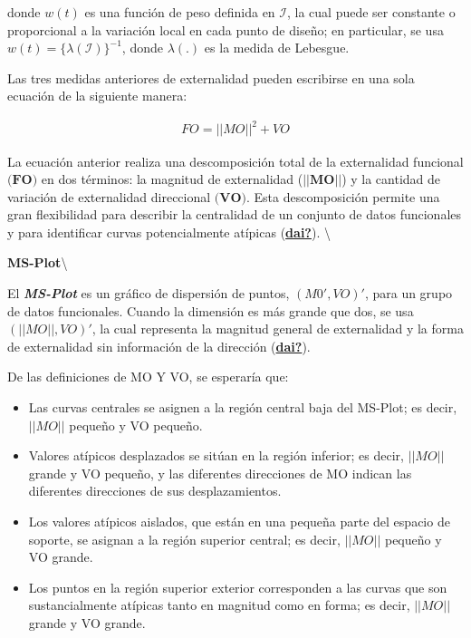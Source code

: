 \documentclass[
]{book}
\begin{document}
donde \(w(t)\) es una función de peso definida en \(\mathcal{I}\), la cual puede ser constante o proporcional a la variación local en cada punto de diseño; en particular, se usa \(w(t)=\{\lambda(\mathcal{I})\}^{-1}\), donde \(\lambda(.)\) es la medida de Lebesgue.

Las tres medidas anteriores de externalidad pueden escribirse en una sola ecuación de la siguiente manera:

\begin{align}
    FO=||MO||^2 +VO
\end{align}

La ecuación anterior realiza una descomposición total de la externalidad funcional \(\textbf{(FO)}\) en dos términos: la magnitud de externalidad (\(||\textbf{MO}||\)) y la cantidad de variación de externalidad direccional \(\textbf{(VO)}\). Esta descomposición permite una gran flexibilidad para describir la centralidad de un conjunto de datos funcionales y para identificar curvas potencialmente atípicas (\protect\hyperlink{ref-dai}{\textbf{dai?}}). \textbackslash{}

\textbf{MS-Plot}\textbackslash{}

El \textbf{\textit{MS-Plot}} es un gráfico de dispersión de puntos, \((M0',VO)'\), para un grupo de datos funcionales. Cuando la dimensión es más grande que dos, se usa \((||MO||,VO)'\), la cual representa la magnitud general de externalidad y la forma de externalidad sin información de la dirección (\protect\hyperlink{ref-dai}{\textbf{dai?}}).

De las definiciones de MO Y VO, se esperaría que:

\begin{itemize}
\item
  Las curvas centrales se asignen a la región central baja del MS-Plot; es decir, \(||MO||\) pequeño y VO pequeño.
\item
  Valores atípicos desplazados se sitúan en la región inferior; es decir, \(||MO||\) grande y VO pequeño, y las diferentes direcciones de MO indican las diferentes direcciones de sus desplazamientos.
\item
  Los valores atípicos aislados, que están en una pequeña parte del espacio de soporte, se asignan a la región superior central; es decir, \(||MO||\) pequeño y VO grande.
\item
  Los puntos en la región superior exterior corresponden a las curvas que son sustancialmente atípicas tanto en magnitud como en forma; es decir, \(||MO||\) grande y VO grande.
\end{itemize}
\end{document}
